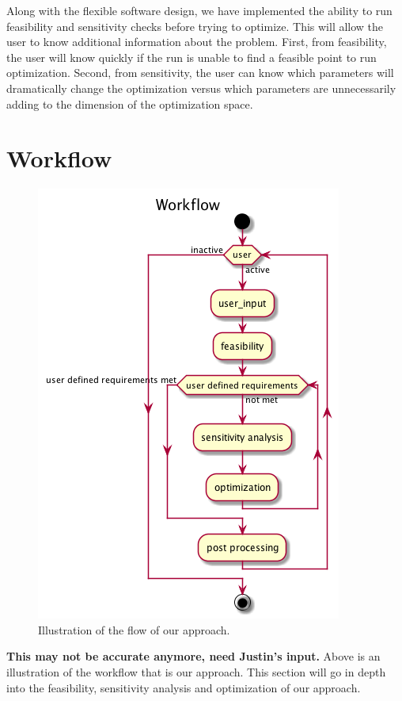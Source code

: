 \documentclass[10pt]{article}
\begin{document}
Along with the flexible software design, we have implemented the ability to run feasibility and sensitivity checks before trying to optimize. This will allow the user to know additional information about the problem. First, from feasibility, the user will know quickly if the run is unable to find a feasible point to run optimization. Second, from sensitivity, the user can know which parameters will dramatically change the optimization versus which parameters are unnecessarily adding to the dimension of the optimization space. 
 


\section{Workflow}
\label{sec:workflow}
 		\begin{figure}[h!]
		 \begin{center}\includegraphics[scale=.4]{IMSM_Workflow.png}\end{center}
		 \caption{Illustration of the flow of our approach.}
		 \label{Workflow}
		 
		 \end{figure}
		 
		 \textbf{This may not be accurate anymore, need Justin's input.}
Above is an illustration of the workflow that is our approach. This section will go in depth into the feasibility, sensitivity analysis and optimization of our approach.
\end{document}
